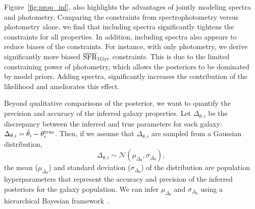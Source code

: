 Figure~\ref{fig:prop_inf}, also highlights the advantages of jointly modeling
spectra and photometry. 
Comparing the constraints from spectrophotometry versus photometry alone, we
find that including spectra significantly tightens the constraints for all
properties. 
In addition, including spectra also appears to reduce biases of the
constraints. 
For instance, with only photometry, we derive significantly more biased
$\overline{\rm SFR}_{\rm 1Gyr}$ constraints.
This is due to the limited constraining power of photometry, which allows the
posteriors to be dominated by model priors. 
Adding spectra, significantly increases the contribution of the likelihood and
ameliorates this effect. 

Beyond qualitative comparisons of the posterior, we want to quantify the
precision and accuracy of the inferred galaxy properties. 
Let $\Delta_{\theta,i}$ be the discrepancy between the inferred and true
parameters for each galaxy: 
$\Delta_{\theta,i} = \hat{\theta}_i - \theta^{\rm true}_i$.
Then, if we assume that $\Delta_{\theta,i}$ are sampled from a Gaussian
distribution,
\begin{equation} \label{eq:eta_gauss}
    \Delta_{\theta,i} \sim \mathcal{N}(\mu_{\Delta_{\theta}}, \sigma_{\Delta_{\theta}}),
\end{equation}
the mean ($\mu_{\Delta_{\theta}}$) and standard deviation
($\sigma_{\Delta_{\theta}}$) of the distribution are population hyperparameters
that represent the accuracy and precision of the inferred posteriors for the
galaxy population. 
We can infer $\mu_{\Delta_{\theta}}$ and $\sigma_{\Delta_{\theta}}$ using a
hierarchical Bayesian framework~\citep[\emph{e.g.}][]{hogg2010,
foreman-mackey2014, baronchelli2020}.

